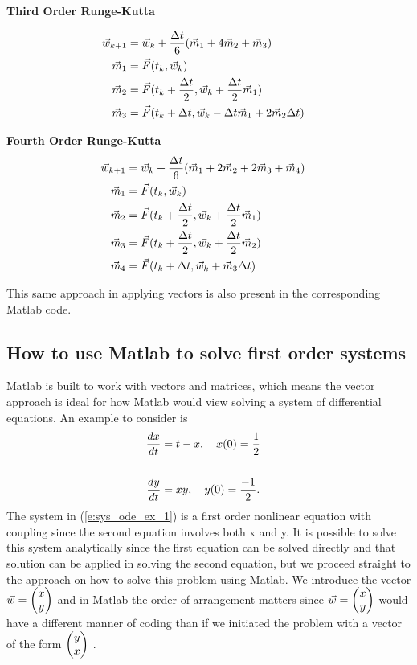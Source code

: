 \documentclass[twoside]{article}
\def\ds{\displaystyle}
\begin{document}
{\bf Third Order Runge-Kutta}
 
\begin{align*}
    \vec w_{k+1} &= \vec w_k + \frac {\Delta t}6(\vec m_1+ 4\vec m_2 + \vec m_3) \cr
    \vec m_1 &= \vec F(t_k,\vec w_k) \cr
    \vec m_2 &= \vec F(t_k + \frac {\Delta t}2,\vec w_k+\frac {\Delta t}2  \vec m_1) \cr
    \vec m_3 &= \vec F(t_k + \Delta t,\vec w_k- {\Delta t}\vec m_1 + 2\vec m_2 \Delta t)
\end{align*}

{\bf Fourth Order Runge-Kutta}
\begin{align*}
    \vec w_{k+1} &= \vec w_k + \frac {\Delta t}6(\vec m_1+ 2\vec m_2 + 2\vec m_3 + \vec m_4) \cr
    \vec m_1 &= \vec F(t_k,\vec w_k) \cr
    \vec m_2 &= \vec F(t_k + \frac {\Delta t}2,\vec w_k+\frac {\Delta t}2  \vec m_1) \cr
    \vec m_3 &= \vec F(t_k + \frac {\Delta t}2,\vec w_k + \frac {\Delta t}2 \vec m_2 ) \cr
    \vec m_4 &= \vec F(t_k + \Delta t,\vec w_k +  \vec m_3 \Delta t)
\end{align*}

This same approach in applying vectors is also present in the corresponding Matlab code. 

\subsection{How to use Matlab to solve first order systems}
Matlab is built to work with vectors and matrices, which means the vector approach is ideal for how Matlab would view solving a system of differential equations. An example to consider is
\begin{eqnarray}
\frac {dx}{dt} &= t-x, \ \ \ x(0)=\frac 12 \cr \cr 
\frac {dy}{dt} &= xy , \ \ \ y(0) = \frac {-1}2.
\label{e:sys_ode_ex_1}
\end{eqnarray}
The system in (\ref{e:sys_ode_ex_1}) is a first order nonlinear equation with coupling since the second equation involves both x and y. It is possible to solve this system analytically since the first equation can be solved directly and that solution can be applied in solving the second equation, but we proceed straight to the approach on how to solve this problem using Matlab. We introduce the vector $\ds \vec w = \begin{pmatrix} x \cr y \end{pmatrix}$ and in Matlab the order of arrangement matters since  $\ds \vec w = \begin{pmatrix} x \cr y \end{pmatrix}$  would have a different manner of coding than if we initiated the problem with a vector of the form  $\ds \begin{pmatrix} y \cr x \end{pmatrix}$ . 
\end{document}

